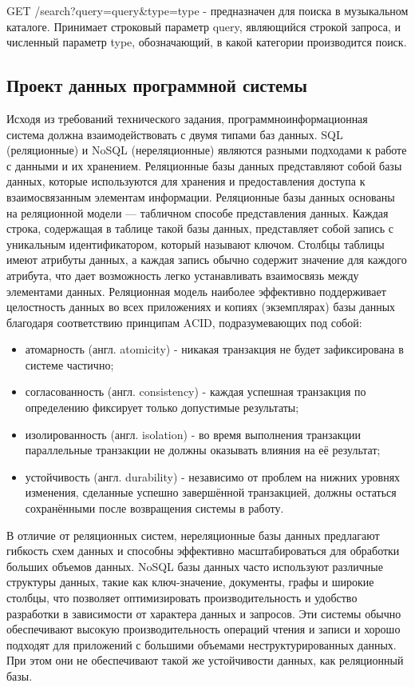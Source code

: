 GET /search?query={query}\&type={}type - предназначен для поиска в музыкальном каталоге. Принимает строковый параметр query, являющийся строкой запроса, и численный параметр type, обозначающий, в какой категории производится поиск.


\subsection{Проект данных программной системы}

Исходя из требований технического задания, программноинформационная система должна взаимодействовать с двумя типами баз
данных.
SQL\cite{sql1} (реляционные) и NoSQL (нереляционные) являются разными подходами к работе с данными и их хранением. Реляционные базы данных представляют собой базы данных, которые используются для хранения и предоставления доступа к взаимосвязанным элементам информации. Реляционные базы данных основаны на реляционной модели — табличном способе представления данных. Каждая строка, содержащая в таблице такой базы данных, представляет собой запись с уникальным идентификатором, который называют ключом. Столбцы таблицы имеют атрибуты данных, а каждая запись обычно содержит значение для каждого атрибута, что дает возможность легко устанавливать взаимосвязь между элементами данных. Реляционная модель наиболее эффективно поддерживает целостность данных во всех приложениях и копиях (экземплярах) базы данных благодаря соответствию принципам ACID, подразумевающих под собой:
\begin{itemize}
	\item атомарность (англ. atomicity) - никакая транзакция не будет зафиксирована в системе частично;
	\item согласованность (англ. consistency) - каждая успешная транзакция по определению фиксирует только допустимые результаты;
	\item изолированность (англ. isolation) - во время выполнения транзакции параллельные транзакции не должны оказывать влияния на её результат;
	\item устойчивость (англ. durability) - независимо от проблем на нижних уровнях изменения, сделанные успешно завершённой транзакцией, должны остаться сохранёнными после возвращения системы в работу.
\end{itemize}
В отличие от реляционных систем, нереляционные базы данных предлагают гибкость схем данных и способны эффективно масштабироваться для обработки больших объемов данных. NoSQL базы данных часто используют различные структуры данных, такие как ключ-значение, документы, графы и широкие столбцы, что позволяет оптимизировать производительность и удобство разработки в зависимости от характера данных и запросов. Эти системы обычно обеспечивают высокую производительность операций чтения и записи и хорошо подходят для приложений с большими объемами неструктурированных данных. При этом они не обеспечивают такой же устойчивости данных, как реляционный базы.
